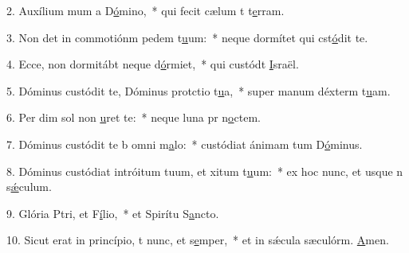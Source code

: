 2. Auxílium mum a D\uline{ó}mino,~* qui fecit cælum t t\uline{e}rram.\par 
3. Non det in commotiónm pedem t\uline{u}um:~* neque dormítet qui cst\uline{ó}dit te.\par 
4. Ecce, non dormitábt neque d\uline{ó}rmiet,~* qui custódt \uline{I}sraël.\par 
5. Dóminus custódit te, Dóminus protctio t\uline{u}a,~* super manum déxterm t\uline{u}am.\par 
6. Per dim sol non \uline{u}ret te:~* neque luna pr n\uline{o}ctem.\par 
7. Dóminus custódit te b omni m\uline{a}lo:~* custódiat ánimam tum D\uline{ó}minus.\par 
8. Dóminus custódiat intróitum tuum, et xitum t\uline{u}um:~* ex hoc nunc, et usque n s\uline{ǽ}culum.\par 
9. Glória Ptri, et F\uline{í}lio,~* et Spirítu S\uline{a}ncto.\par 
10. Sicut erat in princípio, t nunc, et s\uline{e}mper,~* et in sǽcula sæculórm. \uline{A}men.\par 

